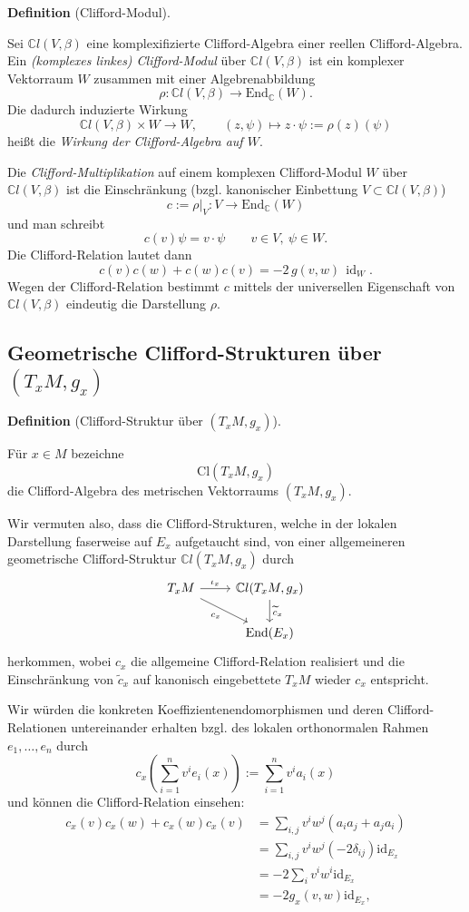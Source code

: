 \documentclass[10pt, letterpaper]{article}
\newcommand{\id}{\operatorname{id}}
\newcommand{\C}{\mathbb{C}}
\newcommand{\End}{\mathrm{End}}
\newcommand{\Cl}{\mathrm{Cl}}
\newcommand{\CustomHeading}[3]{%
  \par\medskip\noindent%
  \textbf{#1 #2} \textnormal{(#3)}.\enskip%
}
\newenvironment{DEF}[2]{\CustomHeading{Definition}{#1}{#2}}{}
\begin{document}
\begin{DEF}{}{Clifford-Modul}
Sei $\C l(V,\beta)$ eine komplexifizierte Clifford-Algebra einer reellen Clifford-Algebra. Ein \emph{(komplexes linkes) Clifford-Modul} über $\C l(V,\beta)$ ist ein komplexer Vektorraum $W$
zusammen mit einer Algebrenabbildung
\[
\rho:\C l(V,\beta)\longrightarrow \End_{\C}(W).
\]
Die dadurch induzierte Wirkung
\[
\C l(V,\beta)\times W\longrightarrow W,\qquad
(z,\psi)\longmapsto z\cdot \psi:=\rho(z)(\psi)
\]
heißt die \emph{Wirkung der Clifford-Algebra auf $W$}.

Die \emph{Clifford-Multiplikation} auf einem komplexen Clifford-Modul $W$ über
$\C l(V,\beta)$ ist die Einschränkung (bzgl. kanonischer Einbettung $V\subset \C l(V,\beta)$)
\[
c:=\rho|_V:V\to \End_{\C}(W)
\]
und man schreibt
\[
c(v)\psi=v\cdot\psi \qquad v\in V,\ \psi\in W.
\]
Die Clifford-Relation lautet dann
\[
c(v)c(w)+c(w)c(v)=-2\,g(v,w)\,\id_{W}.
\]
Wegen der Clifford-Relation bestimmt $c$ mittels der universellen Eigenschaft von $\C l(V, \beta)$ eindeutig die Darstellung $\rho$.
\end{DEF}


\subsection{Geometrische Clifford-Strukturen über $(T_xM,g_x)$}


\begin{DEF}{}{Clifford-Struktur über $(T_xM,g_x)$}
Für $x\in M$ bezeichne 
$$\Cl(T_xM,g_x)$$ 
die Clifford-Algebra des metrischen Vektorraums $(T_xM,g_x)$.

Wir vermuten also, dass die Clifford-Strukturen, welche in der lokalen Darstellung faserweise auf $E_x$ aufgetaucht sind, von einer allgemeineren geometrische Clifford-Struktur $\C l(T_xM,g_x)$ durch 
\[
\begin{tikzcd}
T_xM \arrow[r,"\iota_x"] \arrow[dr,"c_x"'] & \C l(T_xM,g_x) \arrow[d,"\widetilde c_x"] \\
& \End(E_x)
\end{tikzcd}
\]
herkommen, wobei $c_x$ die allgemeine Clifford-Relation realisiert und die Einschränkung von $\widetilde{c}_x$ auf kanonisch eingebettete $T_xM$ wieder $c_x$ entspricht.

Wir würden die konkreten Koeffizientenendomorphismen und deren Clifford-Relationen untereinander erhalten bzgl. des lokalen orthonormalen Rahmen \(e_1,\dots,e_n\) durch
$$c_x\left(\sum_{i=1}^n v^i e_i(x)\right):=\sum_{i=1}^n v^i a_i(x)$$
und können die Clifford-Relation einsehen:
$$\begin{aligned} c_x(v) c_x(w)+c_x(w) c_x(v) & =\sum_{i, j} v^i w^j\left(a_i a_j+a_j a_i\right) \\ & =\sum_{i, j} v^i w^j\left(-2 \delta_{i j}\right) \mathrm{id}_{E_x} \\ & =-2 \sum_i v^i w^i \mathrm{id}_{E_x} \\ & =-2 g_x(v, w) \mathrm{id}_{E_x},\end{aligned}$$
\end{DEF}
\end{document}
